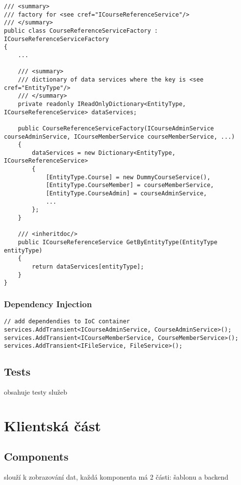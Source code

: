 \begin{lstlisting}
/// <summary>
/// factory for <see cref="ICourseReferenceService"/>
/// </summary>
public class CourseReferenceServiceFactory : ICourseReferenceServiceFactory
{
	...
	
	/// <summary>
	/// dictionary of data services where the key is <see cref="EntityType"/>
	/// </summary>
	private readonly IReadOnlyDictionary<EntityType, ICourseReferenceService> dataServices;
	
	public CourseReferenceServiceFactory(ICourseAdminService courseAdminService, ICourseMemberService courseMemberService, ...)
	{
		dataServices = new Dictionary<EntityType, ICourseReferenceService>
		{
			[EntityType.Course] = new DummyCourseService(),
			[EntityType.CourseMember] = courseMemberService,
			[EntityType.CourseAdmin] = courseAdminService,
			...
		};
	}

	/// <inheritdoc/>
	public ICourseReferenceService GetByEntityType(EntityType entityType)
	{
		return dataServices[entityType];
	}
}
\end{lstlisting}

\subsubsection*{Dependency Injection}

\begin{lstlisting}
// add dependendies to IoC container
services.AddTransient<ICourseAdminService, CourseAdminService>();
services.AddTransient<ICourseMemberService, CourseMemberService>();
services.AddTransient<IFileService, FileService>();
\end{lstlisting}

\newpage

\subsection{Tests}

obsahuje testy služeb

\section{Klientská část}

\subsection{Components}

slouží k zobrazování dat, každá komponenta má 2 části: šablonu a backend

